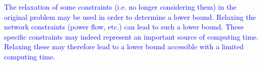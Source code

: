 \textcolor{blue}{The relaxation of some constraints (i.e. no longer considering them) in the original problem may be used in order to determine a lower bound. Relaxing the network constraints (power flow, etc.) can lead to such a lower bound. These specific constraints may indeed represent an important source of computing time. Relaxing these may therefore lead to a lower bound accessible with a limited computing time.}